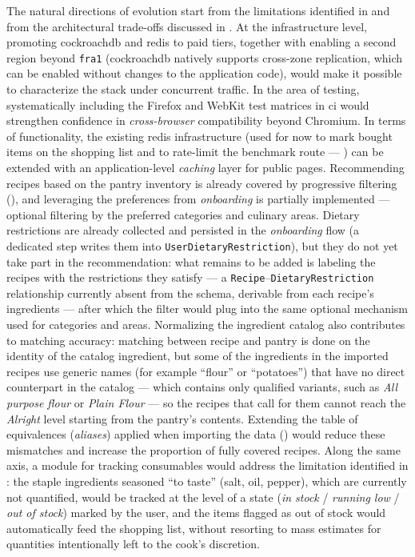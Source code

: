 The natural directions of evolution start from the limitations identified in  and from the architectural trade-offs discussed in .
At the infrastructure level, promoting \gls{cockroachdb} and \gls{redis} to paid tiers, together with enabling a second region beyond \texttt{fra1} (\gls{cockroachdb} natively supports cross-zone replication, which can be enabled without changes to the application code), would make it possible to characterize the stack under concurrent traffic.
In the area of testing, systematically including the Firefox and WebKit test matrices in \acrshort{ci} would strengthen confidence in \textit{cross-browser} compatibility beyond Chromium.
In terms of functionality, the existing \gls{redis} infrastructure (used for now to mark bought items on the shopping list and to rate-limit the benchmark route --- ) can be extended with an application-level \textit{caching} layer for public pages. Recommending recipes based on the pantry inventory is already covered by progressive filtering (), and leveraging the preferences from \textit{onboarding} is partially implemented --- optional filtering by the preferred categories and culinary areas. Dietary restrictions are already collected and persisted in the \textit{onboarding} flow (a dedicated step writes them into \texttt{UserDietaryRestriction}), but they do not yet take part in the recommendation: what remains to be added is labeling the recipes with the restrictions they satisfy --- a \texttt{Recipe}--\texttt{DietaryRestriction} relationship currently absent from the schema, derivable from each recipe's ingredients --- after which the filter would plug into the same optional mechanism used for categories and areas.
Normalizing the ingredient catalog also contributes to matching accuracy: matching between recipe and pantry is done on the identity of the catalog ingredient, but some of the ingredients in the imported recipes use generic names (for example “flour” or “potatoes”) that have no direct counterpart in the catalog --- which contains only qualified variants, such as \textit{All purpose flour} or \textit{Plain Flour} --- so the recipes that call for them cannot reach the \textit{Alright} level starting from the pantry's contents. Extending the table of equivalences (\textit{aliases}) applied when importing the data () would reduce these mismatches and increase the proportion of fully covered recipes.
Along the same axis, a module for tracking consumables would address the limitation identified in : the staple ingredients seasoned “to taste” (salt, oil, pepper), which are currently not quantified, would be tracked at the level of a state (\textit{in stock} / \textit{running low} / \textit{out of stock}) marked by the user, and the items flagged as out of stock would automatically feed the shopping list, without resorting to mass estimates for quantities intentionally left to the cook's discretion.

